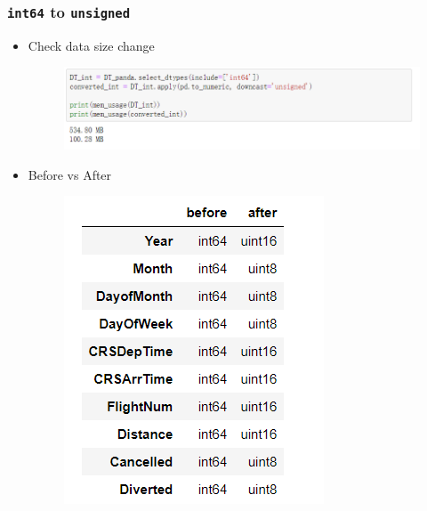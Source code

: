 \documentclass[red]{beamer}
\begin{document}
\begin{frame}
\frametitle{\texttt{int64} to \texttt{unsigned}}
\begin{itemize}
	\item Check data size change
	\begin{figure}
		\centering
		\includegraphics[width=1\linewidth]{figure/screenshot012}
	\end{figure}
	\item Before vs After
	\begin{figure}
		\centering
		\includegraphics[width=0.4\linewidth]{figure/screenshot013}
	\end{figure}
	
\end{itemize}


\end{frame}
\end{document}
